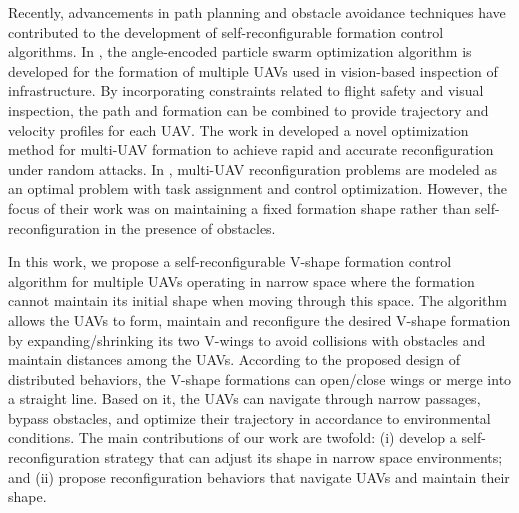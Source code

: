 Recently, advancements in path planning and obstacle avoidance techniques have contributed to the development of self-reconfigurable formation control algorithms. In \cite{8843165}, the angle-encoded particle swarm optimization algorithm is developed for the formation of multiple UAVs used in vision-based inspection of infrastructure. By incorporating constraints related to flight safety and visual inspection, the path and formation can be combined to provide trajectory and velocity profiles for each UAV. The work in \cite{FENG2022} developed a novel optimization method for multi-UAV formation to achieve rapid and accurate reconfiguration under random attacks. In \cite{Gao2022}, multi-UAV reconfiguration problems are modeled as an optimal problem with task assignment and control optimization. However, the focus of their work was on maintaining a fixed formation shape rather than self-reconfiguration in the presence of obstacles.


In this work, we propose a self-reconfigurable V-shape formation control algorithm for multiple UAVs operating in narrow space where the formation cannot maintain its initial shape when moving through this space. The algorithm allows the UAVs to form, maintain and reconfigure the desired V-shape formation by expanding/shrinking its two V-wings to avoid collisions with obstacles and maintain distances among the UAVs. According to the proposed design of distributed behaviors, the V-shape formations can open/close wings or merge into a straight line. Based on it, the UAVs can navigate through narrow passages, bypass obstacles, and optimize their trajectory in accordance to environmental conditions. The main contributions of our work are twofold: (i) develop a self-reconfiguration strategy that can adjust its shape in narrow space environments; and (ii) propose reconfiguration behaviors that navigate UAVs and maintain their shape.

